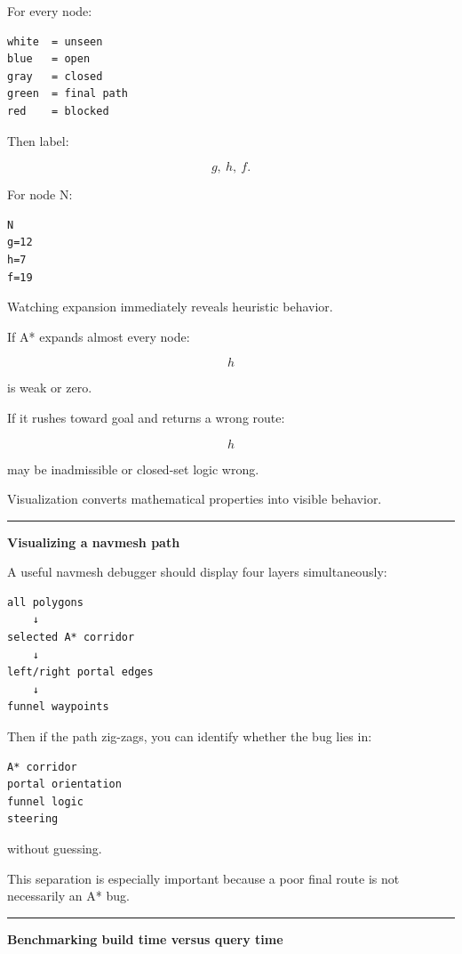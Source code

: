 For every node:

\begin{verbatim}
white  = unseen
blue   = open
gray   = closed
green  = final path
red    = blocked
\end{verbatim}

Then label:

\[
g,\ h,\ f.
\]

For node N:

\begin{verbatim}
N
g=12
h=7
f=19
\end{verbatim}

Watching expansion immediately reveals heuristic behavior.

If A* expands almost every node:

\[
h
\]

is weak or zero.

If it rushes toward goal and returns a wrong route:

\[
h
\]

may be inadmissible or closed-set logic wrong.

Visualization converts mathematical properties into visible behavior.

\begin{center}\rule{0.5\linewidth}{0.5pt}\end{center}

\textbf{Visualizing a navmesh path}

A useful navmesh debugger should display four layers simultaneously:

\begin{verbatim}
all polygons
    ↓
selected A* corridor
    ↓
left/right portal edges
    ↓
funnel waypoints
\end{verbatim}

Then if the path zig-zags, you can identify whether the bug lies in:

\begin{verbatim}
A* corridor
portal orientation
funnel logic
steering
\end{verbatim}

without guessing.

This separation is especially important because a poor final route is not necessarily an A* bug.

\begin{center}\rule{0.5\linewidth}{0.5pt}\end{center}

\textbf{Benchmarking build time versus query time}

